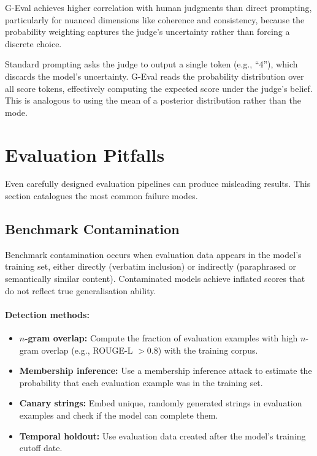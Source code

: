 G-Eval achieves higher correlation with human judgments than direct prompting, particularly for nuanced dimensions like coherence and consistency, because the probability weighting captures the judge’s uncertainty rather than forcing a discrete choice.

\begin{intuitionbox}
Standard prompting asks the judge to output a single token (e.g., ``4''), which discards the model’s uncertainty. G-Eval reads the probability distribution over all score tokens, effectively computing the expected score under the judge’s belief. This is analogous to using the mean of a posterior distribution rather than the mode.
\end{intuitionbox}

\section{Evaluation Pitfalls}
\label{subsec:eval-pitfalls}

Even carefully designed evaluation pipelines can produce misleading results. This section catalogues the most common failure modes.

\subsection{Benchmark Contamination}
\label{benchmark-contamination}

Benchmark contamination occurs when evaluation data appears in the model’s training set, either directly (verbatim inclusion) or indirectly (paraphrased or semantically similar content). Contaminated models achieve inflated scores that do not reflect true generalisation ability.

\paragraph{Detection methods:}
\label{detection-methods}

\begin{itemize}
  \item \textbf{$n$-gram overlap:} Compute the fraction of evaluation examples with high $n$-gram overlap (e.g., ROUGE-L $> 0.8$) with the training corpus.
  \item \textbf{Membership inference:} Use a membership inference attack to estimate the probability that each evaluation example was in the training set.
  \item \textbf{Canary strings:} Embed unique, randomly generated strings in evaluation examples and check if the model can complete them.
  \item \textbf{Temporal holdout:} Use evaluation data created after the model’s training cutoff date.
\end{itemize}

